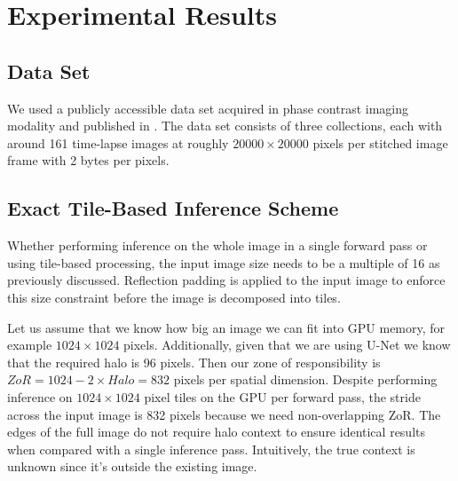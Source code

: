 \documentclass[10pt, indentfirst]{article}
\begin{document}
\section{Experimental Results}
\label{experimental-results}

\subsection{Data Set}
\label{dataset}

We used a publicly accessible data set acquired in phase contrast imaging modality and published in \citep{Bhadriraju2016}. 
The data set consists of three collections, each with around 161 time-lapse images at roughly $\num{20000} \times \num{20000}$  pixels per stitched image frame with 2 bytes per pixels. 


\subsection{Exact Tile-Based Inference Scheme}

Whether performing inference on the whole image in a single forward pass or using tile-based processing, the input image size needs to be a multiple of 16 as previously discussed. Reflection padding is applied to the input image to enforce this size constraint before the image is decomposed into tiles. 

Let us assume that we know how big an image we can fit into GPU memory, for example $1024 \times 1024$ pixels. Additionally, given that we are using U-Net we know that the required halo is 96 pixels. Then our zone of responsibility is $ZoR = 1024 - 2 \times Halo = 832$ pixels per spatial dimension. 
Despite performing inference on $1024 \times 1024$ pixel tiles on the GPU per forward pass, the stride across the input image is 832 pixels because we need non-overlapping ZoR. 
The edges of the full image do not require halo context to ensure identical results when compared with a single inference pass. Intuitively, the true context is unknown since it's outside the existing image.
\end{document}
